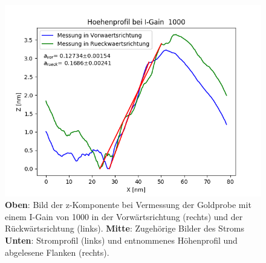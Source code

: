 \documentclass[12pt,a4paper]{article}
\begin{document}
\begin{figure}[H]
\includegraphics[scale=0.5]{Bilder/Anhang/IGain/Profil_IGain_1000.png}
\caption{\textbf{Oben}: Bild der z-Komponente bei Vermessung der Goldprobe mit einem I-Gain von 1000 in der Vorwärtsrichtung (rechts) und der Rückwärtsrichtung (links). \textbf{Mitte}: Zugehörige Bilder des Stroms \textbf{Unten}: Stromprofil (links) und entnommenes Höhenprofil und abgelesene Flanken (rechts).}
\end{figure}
\end{document}
